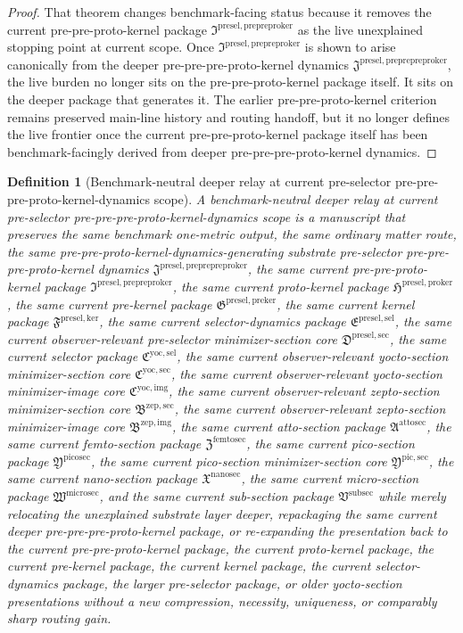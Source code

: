 \documentclass[11pt]{article}
\newcommand{\PrePrePreProtoKernelPackage}{\mathfrak J^{\mathrm{presel,preprepreproker}}}
\newcommand{\PrePreProtoKernelPackage}{\mathfrak I^{\mathrm{presel,prepreproker}}}
\newcommand{\ProtoKernelPackage}{\mathfrak H^{\mathrm{presel,proker}}}
\newcommand{\PreKernelPackage}{\mathfrak G^{\mathrm{presel,preker}}}
\newcommand{\KernelPackage}{\mathfrak F^{\mathrm{presel,ker}}}
\newcommand{\PreSectionSelectorPackage}{\mathfrak E^{\mathrm{presel,sel}}}
\newcommand{\PreSelectorMinSectionCore}{\mathfrak D^{\mathrm{presel,sec}}}
\newcommand{\YoctoSelectorPackage}{\mathfrak C^{\mathrm{yoc,sel}}}
\newcommand{\YoctoImageCore}{\mathfrak C^{\mathrm{yoc,img}}}
\newcommand{\YoctoMinSectionCore}{\mathfrak C^{\mathrm{yoc,sec}}}
\newcommand{\ZeptoImageCore}{\mathfrak B^{\mathrm{zep,img}}}
\newcommand{\ZeptoMinSectionCore}{\mathfrak B^{\mathrm{zep,sec}}}
\newcommand{\AttoSectionPackage}{\mathfrak A^{\mathrm{attosec}}}
\newcommand{\FemtoSectionPackage}{\mathfrak Z^{\mathrm{femtosec}}}
\newcommand{\PicoSectionPackage}{\mathfrak Y^{\mathrm{picosec}}}
\newcommand{\PicoMinSectionCore}{\mathfrak Y^{\mathrm{pic,sec}}}
\newcommand{\NanoSectionPackage}{\mathfrak X^{\mathrm{nanosec}}}
\newcommand{\MicroSectionPackage}{\mathfrak W^{\mathrm{microsec}}}
\newcommand{\SubSectionPackage}{\mathfrak V^{\mathrm{subsec}}}
\newtheorem{definition}{Definition}
\begin{document}
\begin{proof}
That theorem changes benchmark-facing status because it removes the current pre-pre-proto-kernel package \(\PrePreProtoKernelPackage\) as the live unexplained stopping point at current scope. Once \(\PrePreProtoKernelPackage\) is shown to arise canonically from the deeper pre-pre-pre-proto-kernel dynamics \(\PrePrePreProtoKernelPackage\), the live burden no longer sits on the pre-pre-proto-kernel package itself. It sits on the deeper package that generates it. The earlier pre-pre-proto-kernel criterion remains preserved main-line history and routing handoff, but it no longer defines the live frontier once the current pre-pre-proto-kernel package itself has been benchmark-facingly derived from deeper pre-pre-pre-proto-kernel dynamics.
\end{proof}

\begin{definition}[Benchmark-neutral deeper relay at current pre-selector pre-pre-pre-proto-kernel-dynamics scope]
A \emph{benchmark-neutral deeper relay at current pre-selector pre-pre-pre-proto-kernel-dynamics scope} is a manuscript that preserves the same benchmark one-metric output, the same ordinary matter route, the same pre-pre-proto-kernel-dynamics-generating substrate pre-selector pre-pre-pre-proto-kernel dynamics \(\PrePrePreProtoKernelPackage\), the same current pre-pre-proto-kernel package \(\PrePreProtoKernelPackage\), the same current proto-kernel package \(\ProtoKernelPackage\), the same current pre-kernel package \(\PreKernelPackage\), the same current kernel package \(\KernelPackage\), the same current selector-dynamics package \(\PreSectionSelectorPackage\), the same current observer-relevant pre-selector minimizer-section core \(\PreSelectorMinSectionCore\), the same current selector package \(\YoctoSelectorPackage\), the same current observer-relevant yocto-section minimizer-section core \(\YoctoMinSectionCore\), the same current observer-relevant yocto-section minimizer-image core \(\YoctoImageCore\), the same current observer-relevant zepto-section minimizer-section core \(\ZeptoMinSectionCore\), the same current observer-relevant zepto-section minimizer-image core \(\ZeptoImageCore\), the same current atto-section package \(\AttoSectionPackage\), the same current femto-section package \(\FemtoSectionPackage\), the same current pico-section package \(\PicoSectionPackage\), the same current pico-section minimizer-section core \(\PicoMinSectionCore\), the same current nano-section package \(\NanoSectionPackage\), the same current micro-section package \(\MicroSectionPackage\), and the same current sub-section package \(\SubSectionPackage\) while merely relocating the unexplained substrate layer deeper, repackaging the same current deeper pre-pre-pre-proto-kernel package, or re-expanding the presentation back to the current pre-pre-proto-kernel package, the current proto-kernel package, the current pre-kernel package, the current kernel package, the current selector-dynamics package, the larger pre-selector package, or older yocto-section presentations without a new compression, necessity, uniqueness, or comparably sharp routing gain.
\end{definition}
\end{document}
